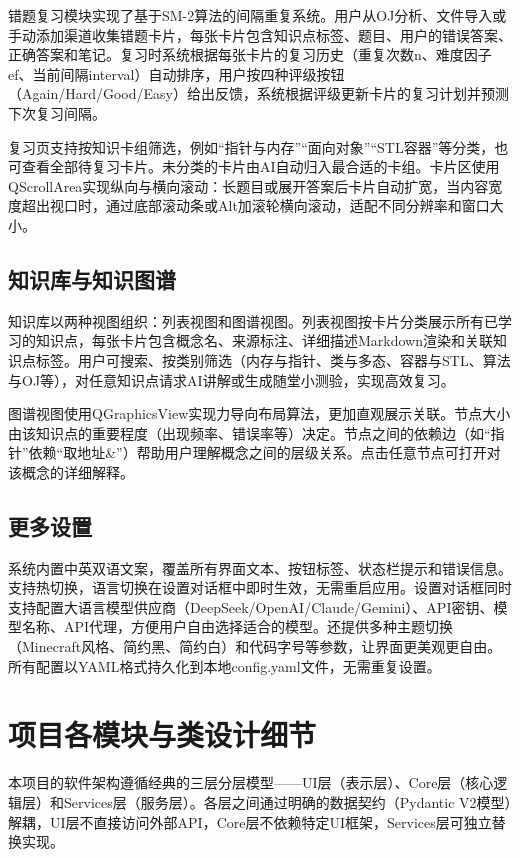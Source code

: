 \documentclass[12pt,a4paper]{ctexart}
\begin{document}
错题复习模块实现了基于SM-2算法的间隔重复系统。用户从OJ分析、文件导入或手动添加渠道收集错题卡片，每张卡片包含知识点标签、题目、用户的错误答案、正确答案和笔记。复习时系统根据每张卡片的复习历史（重复次数n、难度因子ef、当前间隔interval）自动排序，用户按四种评级按钮（Again/Hard/Good/Easy）给出反馈，系统根据评级更新卡片的复习计划并预测下次复习间隔。

复习页支持按知识卡组筛选，例如“指针与内存”“面向对象”“STL容器”等分类，也可查看全部待复习卡片。未分类的卡片由AI自动归入最合适的卡组。卡片区使用QScrollArea实现纵向与横向滚动：长题目或展开答案后卡片自动扩宽，当内容宽度超出视口时，通过底部滚动条或Alt加滚轮横向滚动，适配不同分辨率和窗口大小。

\subsection{知识库与知识图谱}

知识库以两种视图组织：列表视图和图谱视图。列表视图按卡片分类展示所有已学习的知识点，每张卡片包含概念名、来源标注、详细描述Markdown渲染和关联知识点标签。用户可搜索、按类别筛选（内存与指针、类与多态、容器与STL、算法与OJ等），对任意知识点请求AI讲解或生成随堂小测验，实现高效复习。

图谱视图使用QGraphicsView实现力导向布局算法，更加直观展示关联。节点大小由该知识点的重要程度（出现频率、错误率等）决定。节点之间的依赖边（如“指针”依赖“取地址\&”）帮助用户理解概念之间的层级关系。点击任意节点可打开对该概念的详细解释。

\subsection{更多设置}

系统内置中英双语文案，覆盖所有界面文本、按钮标签、状态栏提示和错误信息。支持热切换，语言切换在设置对话框中即时生效，无需重启应用。设置对话框同时支持配置大语言模型供应商（DeepSeek/OpenAI/Claude/Gemini）、API密钥、模型名称、API代理，方便用户自由选择适合的模型。还提供多种主题切换（Minecraft风格、简约黑、简约白）和代码字号等参数，让界面更美观更自由。所有配置以YAML格式持久化到本地config.yaml文件，无需重复设置。

\section{项目各模块与类设计细节}

本项目的软件架构遵循经典的三层分层模型——UI层（表示层）、Core层（核心逻辑层）和Services层（服务层）。各层之间通过明确的数据契约（Pydantic V2模型）解耦，UI层不直接访问外部API，Core层不依赖特定UI框架，Services层可独立替换实现。
\end{document}
